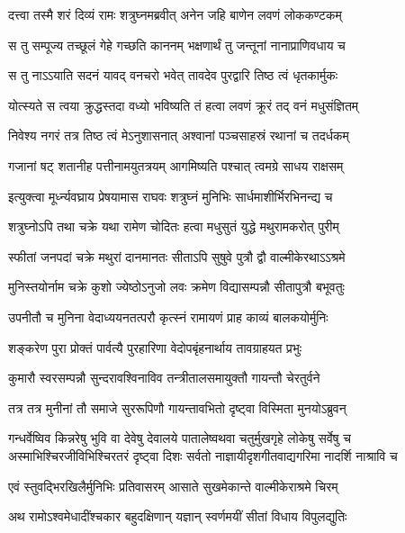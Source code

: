 \twolineshloka
{दत्त्वा तस्मै शरं दिव्यं रामः शत्रुघ्नमब्रवीत्}
{अनेन जहि बाणेन लवणं लोककण्टकम्} %

\twolineshloka
{स तु सम्पूज्य तच्छूलं गेहे गच्छति काननम्}
{भक्षणार्थं तु जन्तूनां नानाप्राणिवधाय च} %

\twolineshloka
{स तु नाऽऽयाति सदनं यावद् वनचरो भवेत्}
{तावदेव पुरद्वारि तिष्ठ त्वं धृतकार्मुकः} %

\twolineshloka
{योत्स्यते स त्वया क्रुद्धस्तदा वध्यो भविष्यति}
{तं हत्वा लवणं क्रूरं तद् वनं मधुसंज्ञितम्} %

\twolineshloka
{निवेश्य नगरं तत्र तिष्ठ त्वं मेऽनुशासनात्}
{अश्वानां पञ्चसाहस्रं रथानां च तदर्धकम्} %

\twolineshloka
{गजानां षट् शतानीह पत्तीनामयुतत्रयम्}
{आगमिष्यति पश्चात् त्वमग्रे साधय राक्षसम्} %

\twolineshloka
{इत्युक्त्वा मूर्ध्न्यवघ्राय प्रेषयामास राघवः}
{शत्रुघ्नं मुनिभिः सार्धमाशीर्भिरभिनन्द्य च} %

\twolineshloka
{शत्रुघ्नोऽपि तथा चक्रे यथा रामेण चोदितः}
{हत्वा मधुसुतं युद्धे मथुरामकरोत् पुरीम्} %

\twolineshloka
{स्फीतां जनपदां चक्रे मथुरां दानमानतः}
{सीताऽपि सुषुवे पुत्रौ द्वौ वाल्मीकेरथाऽऽश्रमे} %

\twolineshloka
{मुनिस्तयोर्नाम चक्रे कुशो ज्येष्ठोऽनुजो लवः}
{क्रमेण विद्यासम्पन्नौ सीतापुत्रौ बभूवतुः} %

\twolineshloka
{उपनीतौ च मुनिना वेदाध्ययनतत्परौ}
{कृत्स्नं रामायणं प्राह काव्यं बालकयोर्मुनिः} %

\twolineshloka
{शङ्करेण पुरा प्रोक्तं पार्वत्यै पुरहारिणा}
{वेदोपबृंहनार्थाय तावग्राहयत प्रभुः} %

\twolineshloka
{कुमारौ स्वरसम्पन्नौ सुन्दरावश्विनाविव}
{तन्त्रीतालसमायुक्तौ गायन्तौ चेरतुर्वने} %

\twolineshloka
{तत्र तत्र मुनीनां तौ समाजे सुररूपिणौ}
{गायन्तावभितो दृष्ट्वा विस्मिता मुनयोऽब्रुवन्} %

\fourlineindentedshloka
{गन्धर्वेष्विव किन्नरेषु भुवि वा देवेषु देवालये}
{पातालेष्वथवा चतुर्मुखगृहे लोकेषु सर्वेषु च}
{अस्माभिश्चिरजीविभिश्चिरतरं दृष्ट्वा दिशः सर्वतो}
{नाज्ञायीदृशगीतवाद्यगरिमा नादर्शि नाश्रावि च} %

\twolineshloka
{एवं स्तुवद्भिरखिलैर्मुनिभिः प्रतिवासरम्}
{आसाते सुखमेकान्ते वाल्मीकेराश्रमे चिरम्} %

\twolineshloka
{अथ रामोऽश्वमेधादींश्चकार बहुदक्षिणान्}
{यज्ञान् स्वर्णमयीं सीतां विधाय विपुलद्युतिः} %

